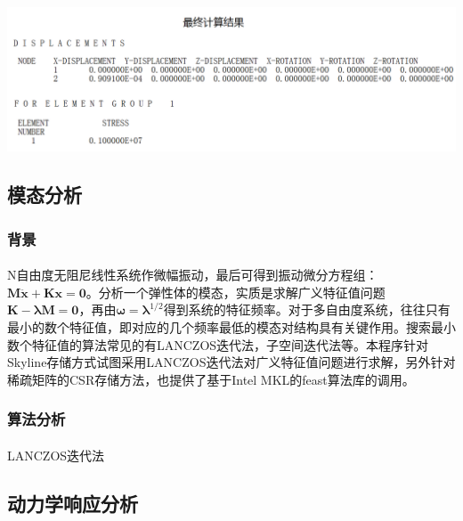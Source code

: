 \documentclass[UTF8]{ctexbook}
\begin{document}
\begin{center}
\includegraphics[width=1.0\textwidth]{plastic6.png}
\end{center}
\subsection{模态分析}
\subsubsection{背景}
\paragraph{}
N自由度无阻尼线性系统作微幅振动，最后可得到振动微分方程组：$\boldsymbol{M\ddot x+Kx=0}$。分析一个弹性体的模态，实质是求解广义特征值问题$\boldsymbol{K-\lambda M=0}$，再由$\boldsymbol{\omega =\lambda}^{1/2}$得到系统的特征频率。对于多自由度系统，往往只有最小的数个特征值，即对应的几个频率最低的模态对结构具有关键作用。搜索最小数个特征值的算法常见的有LANCZOS迭代法，子空间迭代法等。本程序针对Skyline存储方式试图采用LANCZOS迭代法对广义特征值问题进行求解，另外针对稀疏矩阵的CSR存储方法，也提供了基于Intel MKL的feast算法库的调用。
\subsubsection{算法分析}
\paragraph{}
LANCZOS迭代法

\subsection{动力学响应分析}
\end{document}
